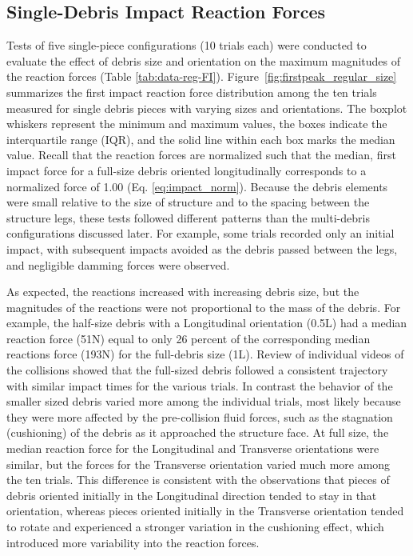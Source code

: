 \documentclass[10pt,a4paper]{article}
\begin{document}
\subsection*{Single-Debris Impact Reaction Forces}
Tests of five single-piece configurations (10 trials each) were conducted to evaluate the effect of debris size and orientation on the maximum magnitudes of the reaction forces (Table \ref{tab:data-reg-FI}). Figure~\ref{fig:firstpeak_regular_size} summarizes the first impact reaction force distribution among the ten trials measured for single debris pieces with varying sizes and orientations. The boxplot whiskers represent the minimum and maximum values, the boxes indicate the interquartile range (IQR), and the solid line within each box marks the median value.  Recall that the reaction forces are normalized such that the median, first impact force for a full-size debris oriented longitudinally corresponds to a normalized force of 1.00 (Eq. \ref{eq:impact_norm}).
Because the debris elements were small relative to the size of structure and to the spacing between the structure legs, these tests followed different patterns than the multi-debris configurations discussed later. For example, some trials recorded only an initial impact, with subsequent impacts avoided as the debris passed between the legs, and negligible damming forces were observed. 

As expected, the reactions increased with increasing debris size, but the magnitudes of the reactions were not proportional to the mass of the debris. For example, the half-size debris with a Longitudinal orientation (0.5L) had a median reaction force (51N) equal to only 26 percent of the corresponding median reactions force (193N) for the full-debris size (1L). Review of individual videos of the collisions showed that the full-sized debris followed a consistent trajectory with similar impact times for the various trials. In contrast the behavior of the smaller sized debris varied more among the individual trials, most likely because they were more affected by the pre-collision fluid forces, such as the stagnation (cushioning) of the debris as it approached the structure face. At full size, the median reaction force for the Longitudinal and Transverse orientations were similar, but the forces for the Transverse orientation varied much more among the ten trials.  This difference is consistent with the observations that pieces of debris oriented initially in the Longitudinal direction tended to stay in that orientation, whereas pieces oriented initially in the Transverse orientation tended to rotate and experienced a stronger variation in the cushioning effect, which introduced more variability into the reaction forces.
\end{document}

